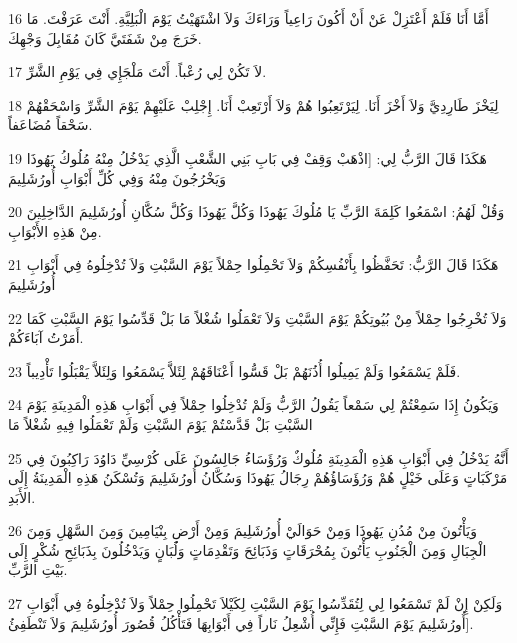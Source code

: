 \par 16 أَمَّا أَنَا فَلَمْ أَعْتَزِلْ عَنْ أَنْ أَكُونَ رَاعِياً وَرَاءَكَ وَلاَ اشْتَهَيْتُ يَوْمَ الْبَلِيَّةِ. أَنْتَ عَرَفْتَ. مَا خَرَجَ مِنْ شَفَتَيَّ كَانَ مُقَابِلَ وَجْهِكَ.
\par 17 لاَ تَكُنْ لِي رُعْباً. أَنْتَ مَلْجَإِي فِي يَوْمِ الشَّرِّ.
\par 18 لِيَخْزَ طَارِدِيَّ وَلاَ أَخْزَ أَنَا. لِيَرْتَعِبُوا هُمْ وَلاَ أَرْتَعِبْ أَنَا. إِجْلِبْ عَلَيْهِمْ يَوْمَ الشَّرِّ وَاسْحَقْهُمْ سَحْقاً مُضَاعَفاً.
\par 19 هَكَذَا قَالَ الرَّبُّ لِي: [اذْهَبْ وَقِفْ فِي بَابِ بَنِي الشَّعْبِ الَّذِي يَدْخُلُ مِنْهُ مُلُوكُ يَهُوذَا وَيَخْرُجُونَ مِنْهُ وَفِي كُلِّ أَبْوَابِ أُورُشَلِيمَ
\par 20 وَقُلْ لَهُمُ: اسْمَعُوا كَلِمَةَ الرَّبِّ يَا مُلُوكَ يَهُوذَا وَكُلَّ يَهُوذَا وَكُلَّ سُكَّانِ أُورُشَلِيمَ الدَّاخِلِينَ مِنْ هَذِهِ الأَبْوَابِ.
\par 21 هَكَذَا قَالَ الرَّبُّ: تَحَفَّظُوا بِأَنْفُسِكُمْ وَلاَ تَحْمِلُوا حِمْلاً يَوْمَ السَّبْتِ وَلاَ تُدْخِلُوهُ فِي أَبْوَابِ أُورُشَلِيمَ
\par 22 وَلاَ تُخْرِجُوا حِمْلاً مِنْ بُيُوتِكُمْ يَوْمَ السَّبْتِ وَلاَ تَعْمَلُوا شُغْلاً مَا بَلْ قَدِّسُوا يَوْمَ السَّبْتِ كَمَا أَمَرْتُ آبَاءَكُمْ.
\par 23 فَلَمْ يَسْمَعُوا وَلَمْ يَمِيلُوا أُذُنَهُمْ بَلْ قَسُّوا أَعْنَاقَهُمْ لِئَلاَّ يَسْمَعُوا وَلِئَلاَّ يَقْبَلُوا تَأْدِيباً.
\par 24 وَيَكُونُ إِذَا سَمِعْتُمْ لِي سَمْعاً يَقُولُ الرَّبُّ وَلَمْ تُدْخِلُوا حِمْلاً فِي أَبْوَابِ هَذِهِ الْمَدِينَةِ يَوْمَ السَّبْتِ بَلْ قَدَّسْتُمْ يَوْمَ السَّبْتِ وَلَمْ تَعْمَلُوا فِيهِ شُغْلاً مَا
\par 25 أَنَّهُ يَدْخُلُ فِي أَبْوَابِ هَذِهِ الْمَدِينَةِ مُلُوكٌ وَرُؤَسَاءُ جَالِسُونَ عَلَى كُرْسِيِّ دَاوُدَ رَاكِبُونَ فِي مَرْكَبَاتٍ وَعَلَى خَيْلٍ هُمْ وَرُؤَسَاؤُهُمْ رِجَالُ يَهُوذَا وَسُكَّانُ أُورُشَلِيمَ وَتُسْكَنُ هَذِهِ الْمَدِينَةُ إِلَى الأَبَدِ.
\par 26 وَيَأْتُونَ مِنْ مُدُنِ يَهُوذَا وَمِنْ حَوَالَيْ أُورُشَلِيمَ وَمِنْ أَرْضِ بِنْيَامِينَ وَمِنَ السَّهْلِ وَمِنَ الْجِبَالِ وَمِنَ الْجَنُوبِ يَأْتُونَ بِمُحْرَقَاتٍ وَذَبَائِحَ وَتَقْدِمَاتٍ وَلُبَانٍ وَيَدْخُلُونَ بِذَبَائِحِ شُكْرٍ إِلَى بَيْتِ الرَّبِّ.
\par 27 وَلَكِنْ إِنْ لَمْ تَسْمَعُوا لِي لِتُقَدِّسُوا يَوْمَ السَّبْتِ لِكَيْلاَ تَحْمِلُوا حِمْلاً وَلاَ تُدْخِلُوهُ فِي أَبْوَابِ أُورُشَلِيمَ يَوْمَ السَّبْتِ فَإِنِّي أُشْعِلُ نَاراً فِي أَبْوَابِهَا فَتَأْكُلُ قُصُورَ أُورُشَلِيمَ وَلاَ تَنْطَفِئُ].

